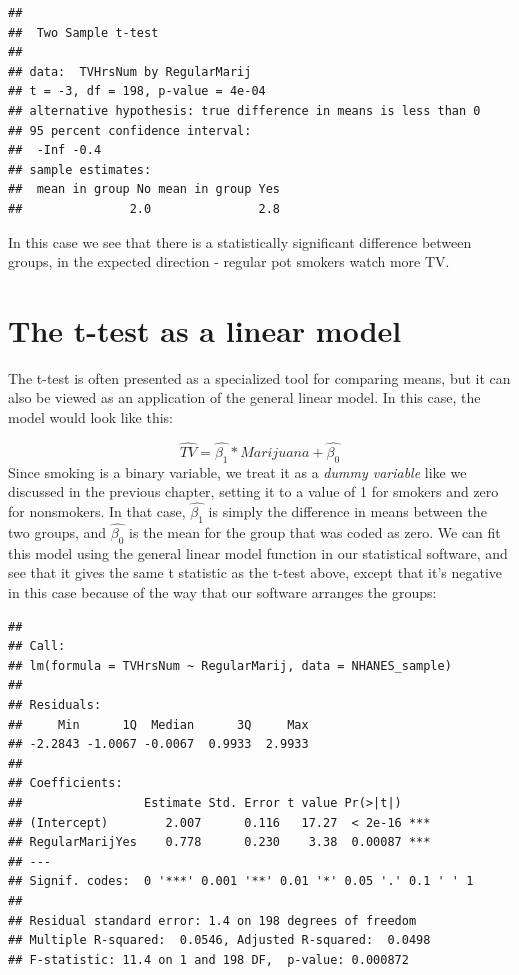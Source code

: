 \documentclass[12pt,]{book}
\theoremstyle{definition}
\theoremstyle{definition}
\theoremstyle{definition}
\theoremstyle{remark}
\begin{document}
\begin{verbatim}
## 
##  Two Sample t-test
## 
## data:  TVHrsNum by RegularMarij
## t = -3, df = 198, p-value = 4e-04
## alternative hypothesis: true difference in means is less than 0
## 95 percent confidence interval:
##  -Inf -0.4
## sample estimates:
##  mean in group No mean in group Yes 
##               2.0               2.8
\end{verbatim}

In this case we see that there is a statistically significant difference between groups, in the expected direction - regular pot smokers watch more TV.

\hypertarget{ttest-linear-model}{%
\section{The t-test as a linear model}\label{ttest-linear-model}}

The t-test is often presented as a specialized tool for comparing means, but it can also be viewed as an application of the general linear model. In this case, the model would look like this:

\[
\hat{TV} = \hat{\beta_1}*Marijuana + \hat{\beta_0}
\]
Since smoking is a binary variable, we treat it as a \emph{dummy variable} like we discussed in the previous chapter, setting it to a value of 1 for smokers and zero for nonsmokers. In that case, \(\hat{\beta_1}\) is simply the difference in means between the two groups, and \(\hat{\beta_0}\) is the mean for the group that was coded as zero. We can fit this model using the general linear model function in our statistical software, and see that it gives the same t statistic as the t-test above, except that it's negative in this case because of the way that our software arranges the groups:

\begin{verbatim}
## 
## Call:
## lm(formula = TVHrsNum ~ RegularMarij, data = NHANES_sample)
## 
## Residuals:
##     Min      1Q  Median      3Q     Max 
## -2.2843 -1.0067 -0.0067  0.9933  2.9933 
## 
## Coefficients:
##                 Estimate Std. Error t value Pr(>|t|)    
## (Intercept)        2.007      0.116   17.27  < 2e-16 ***
## RegularMarijYes    0.778      0.230    3.38  0.00087 ***
## ---
## Signif. codes:  0 '***' 0.001 '**' 0.01 '*' 0.05 '.' 0.1 ' ' 1
## 
## Residual standard error: 1.4 on 198 degrees of freedom
## Multiple R-squared:  0.0546, Adjusted R-squared:  0.0498 
## F-statistic: 11.4 on 1 and 198 DF,  p-value: 0.000872
\end{verbatim}
\end{document}
